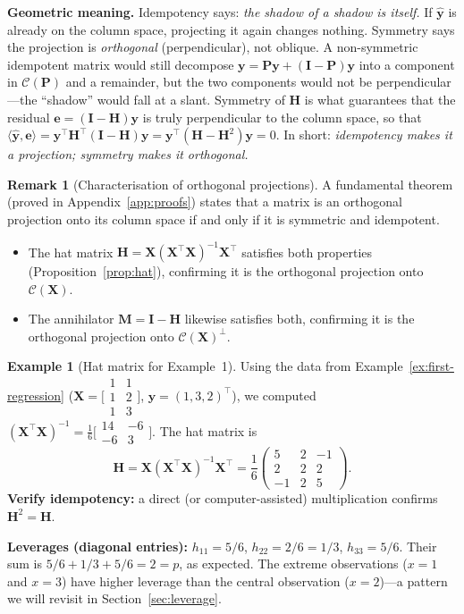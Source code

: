 \documentclass[11pt,a4paper]{article}
\theoremstyle{plain}
\theoremstyle{definition}
\newtheorem{example}[theorem]{Example}
\newtheorem{remark}[theorem]{Remark}
\newcommand{\yhat}{\hat{\bm{y}}}
\newcommand{\bX}{\bm{X}}
\newcommand{\by}{\bm{y}}
\newcommand{\be}{\bm{e}}
\newcommand{\bH}{\bm{H}}
\newcommand{\bM}{\bm{M}}
\newcommand{\bI}{\bm{I}}
\newcommand{\Col}{\mathcal{C}}
\newcommand{\ip}[2]{\langle #1, #2 \rangle}
\begin{document}
\noindent\textbf{Geometric meaning.}
Idempotency says: \emph{the shadow of a shadow is itself.}
If $\yhat$ is already on the column space, projecting it again
changes nothing.
Symmetry says the projection is \emph{orthogonal} (perpendicular), not
oblique.
A non-symmetric idempotent matrix would still decompose
$\by = \bm{P}\by + (\bI - \bm{P})\by$ into a component in $\Col(\bm{P})$
and a remainder, but the two components would not be perpendicular---the
``shadow'' would fall at a slant.
Symmetry of $\bH$ is what guarantees that the residual $\be = (\bI-\bH)\by$
is truly perpendicular to the column space, so that
$\ip{\yhat}{\be} = \by^\top\bH^\top(\bI-\bH)\by = \by^\top(\bH - \bH^2)\by = 0$.
In short: \emph{idempotency makes it a projection; symmetry makes it orthogonal.}

\begin{remark}[Characterisation of orthogonal projections]
A fundamental theorem (proved in Appendix~\ref{app:proofs}) states that a
matrix is an orthogonal projection onto its column space if and only if it
is symmetric and idempotent.
\begin{itemize}[nosep]
  \item The hat matrix $\bH = \bX(\bX^\top\bX)^{-1}\bX^\top$ satisfies both
        properties (Proposition~\ref{prop:hat}), confirming it is the orthogonal
        projection onto $\Col(\bX)$.
  \item The annihilator $\bM = \bI - \bH$ likewise satisfies both, confirming
        it is the orthogonal projection onto $\Col(\bX)^\perp$.
\end{itemize}
\end{remark}

\begin{example}[Hat matrix for Example~1]\label{ex:hat-numerical}
Using the data from Example~\ref{ex:first-regression}
($\bX = \bigl[\begin{smallmatrix}1&1\\1&2\\1&3\end{smallmatrix}\bigr]$,
$\by = (1,3,2)^\top$),
we computed $(\bX^\top\bX)^{-1} = \tfrac{1}{6}\bigl[\begin{smallmatrix}14&-6\\-6&3\end{smallmatrix}\bigr]$.
The hat matrix is
\[
  \bH = \bX(\bX^\top\bX)^{-1}\bX^\top
  = \frac{1}{6}\begin{pmatrix}5 & 2 & -1\\ 2 & 2 & 2\\ -1 & 2 & 5\end{pmatrix}.
\]
\textbf{Verify idempotency:} a direct (or computer-assisted) multiplication confirms $\bH^2 = \bH$.

\textbf{Leverages (diagonal entries):}
$h_{11} = 5/6$, $h_{22} = 2/6 = 1/3$, $h_{33} = 5/6$.
Their sum is $5/6 + 1/3 + 5/6 = 2 = p$, as expected.
The extreme observations ($x=1$ and $x=3$) have higher leverage than the central observation ($x=2$)---a pattern we will revisit in Section~\ref{sec:leverage}.
\end{example}
\end{document}
